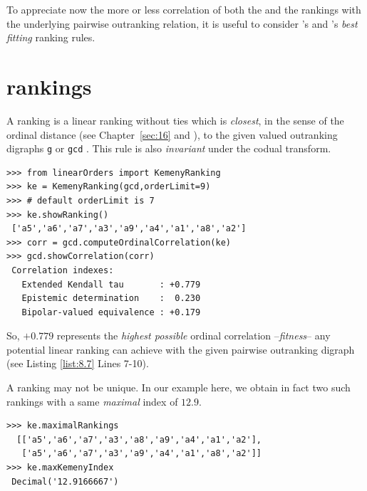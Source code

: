 To appreciate now the more or less correlation of both the \Copeland and the \NetFlows rankings with the underlying pairwise outranking relation, it is useful to consider \Kemeny 's and \Slater 's \emph{best fitting} ranking rules.

\section{\Kemeny rankings}
\label{sec:8.4}

A \Kemeny ranking is a linear ranking without ties which is \emph{closest}, in the sense of the ordinal \Kendall distance (see Chapter~\ref{sec:16} and \citet{BIS-2012a}), to the given valued outranking digraphs \texttt{g} or \texttt{gcd} \citep{KEM-1959}. This rule is also \emph{invariant} under the codual transform. 
\begin{lstlisting}[caption={Computing a \Kemeny ranking},label=list:8.7]   
>>> from linearOrders import KemenyRanking
>>> ke = KemenyRanking(gcd,orderLimit=9)
>>> # default orderLimit is 7
>>> ke.showRanking()
 ['a5','a6','a7','a3','a9','a4','a1','a8','a2']
>>> corr = gcd.computeOrdinalCorrelation(ke)
>>> gcd.showCorrelation(corr)
 Correlation indexes:
   Extended Kendall tau       : +0.779
   Epistemic determination    :  0.230
   Bipolar-valued equivalence : +0.179
\end{lstlisting}    
So, $+0.779$ represents the \emph{highest possible} ordinal correlation --\emph{fitness}-- any potential linear ranking can achieve with the given pairwise outranking digraph (see Listing \ref{list:8.7} Lines 7-10).

A \Kemeny ranking may not be unique. In our example here, we obtain in fact two such \Kemeny rankings with a same \emph{maximal} \Kemeny index of $12.9$. 
\begin{lstlisting}[caption={Optimal \Kemeny rankings},label=list:8.8] >>> ke.maximalRankings
  [['a5','a6','a7','a3','a8','a9','a4','a1','a2'],
   ['a5','a6','a7','a3','a9','a4','a1','a8','a2']]
>>> ke.maxKemenyIndex
 Decimal('12.9166667')
\end{lstlisting}

